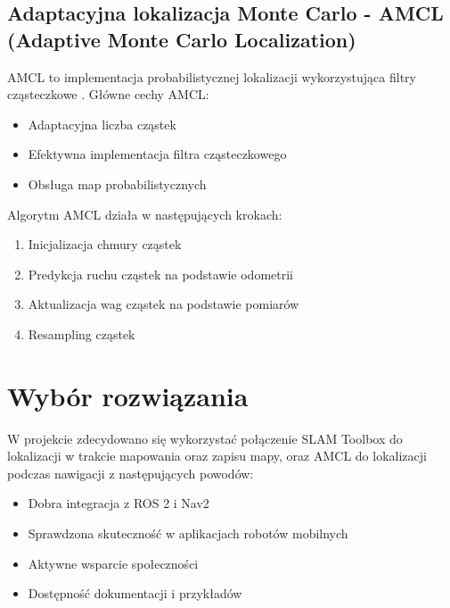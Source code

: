 \documentclass[a4paper,twoside,12pt]{book}
\newtheorem{Definition}{Definicja}
\newtheorem{Example}{Przykład}
\newtheorem{Theorem}{Twierdzenie}
\begin{document}
\subsection{Adaptacyjna lokalizacja Monte Carlo - AMCL (Adaptive Monte Carlo Localization)}
AMCL to implementacja probabilistycznej lokalizacji wykorzystująca filtry cząsteczkowe \cite{bib:amcl}. Główne cechy AMCL:
\begin{itemize}
\item Adaptacyjna liczba cząstek
\item Efektywna implementacja filtra cząsteczkowego
\item Obsługa map probabilistycznych
\end{itemize}

Algorytm AMCL działa w następujących krokach:
\begin{enumerate}
\item Inicjalizacja chmury cząstek
\item Predykcja ruchu cząstek na podstawie odometrii
\item Aktualizacja wag cząstek na podstawie pomiarów
\item Resampling cząstek
\end{enumerate}

\section{Wybór rozwiązania}
W projekcie zdecydowano się wykorzystać połączenie SLAM Toolbox do lokalizacji w trakcie mapowania oraz zapisu mapy, oraz AMCL do lokalizacji podczas nawigacji z następujących powodów:
\begin{itemize}
\item Dobra integracja z ROS 2 i Nav2
\item Sprawdzona skuteczność w aplikacjach robotów mobilnych
\item Aktywne wsparcie społeczności
\item Dostępność dokumentacji i przykładów
\end{itemize}



%
%
\end{document}
